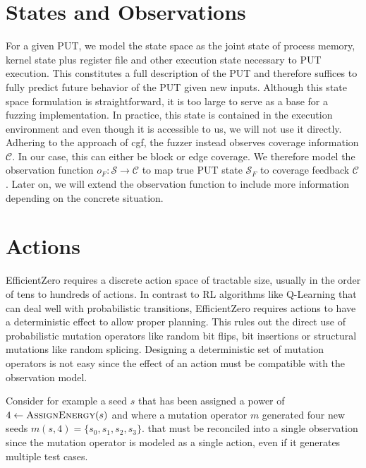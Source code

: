 
\section{States and Observations}

For a given PUT, we model the state space as the joint state of process memory,
kernel state plus register file and other execution state necessary to PUT execution.
This constitutes a full description of the PUT and therefore suffices to fully predict future
behavior of the PUT given new inputs.
Although this state space formulation is straightforward, it is too large to serve as a
base for a fuzzing implementation.
In practice, this state is contained in the execution environment and even though it
is accessible to us, we will not use it directly.
Adhering to the approach of \gls{cgf}, the fuzzer instead observes coverage information $\mathcal{C}$.
In our case, this can either be block or edge coverage.
We therefore model the observation function $o_F:\mathcal{S}\rightarrow\mathcal{C}$ to map
true PUT state $\mathcal{S}_F$ to coverage feedback $\mathcal{C}$.
Later on, we will extend the observation function to include more information
depending on the concrete situation.

\section{Actions}

EfficientZero requires a discrete action space of tractable size, usually in the
order of tens to hundreds of actions.
In contrast to RL algorithms like Q-Learning that can deal well with probabilistic
transitions, EfficientZero requires actions to have a deterministic effect to allow proper planning.
This rules out the direct use of probabilistic mutation operators like random
bit flips, bit insertions or structural mutations like random splicing.
Designing a deterministic set of mutation operators is not easy since the effect
of an action must be compatible with the observation model.

Consider for example a seed $s$ that has been assigned a power of
$4\leftarrow\textsc{AssignEnergy}(s)$ and where a
mutation operator $m$ generated four new seeds $m(s,4)=\{s_0,s_1,s_2,s_3\}$.
that must be reconciled into a single observation since the mutation operator is modeled
as a single action, even if it generates multiple test cases.

